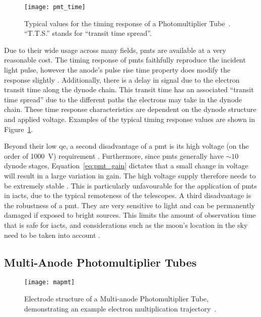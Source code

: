 \begin{figure}
	\centering
    \texttt{[image: pmt\_time]} 
	\caption[Photomultiplier Tube timing characteristics.]{Typical values for the timing response of a Photomultiplier Tube~\cite{Hamamatsu2016}. ``T.T.S.'' stands for ``transit time spread''.}
	\label{fig:pmt_time}
\end{figure}

Due to their wide usage across many fields, \glspl{pmt} are available at a very reasonable cost. The timing response of \glspl{pmt} faithfully reproduce the incident light pulse, however the anode's pulse rise time property does modify the response slightly \cite{Hamamatsu2016}. Additionally, there is a delay in signal due to the electron transit time along the dynode chain. This transit time has an associated ``transit time spread'' due to the different paths the electrons may take in the dynode chain. These time response characteristics are dependent on the dynode structure and applied voltage. Examples of the typical timing response values are shown in Figure~\ref{fig:pmt_time}.

Beyond their low \gls{qe}, a second disadvantage of a \gls{pmt} is its high voltage (on the order of \SI{1000}{V}) requirement \cite{Weekes2003}. Furthermore, since \glspl{pmt} generally have ${\sim} 10$ dynode stages, Equation~\ref{eq:pmt_gain} dictates that a small change in voltage will result in a large variation in gain. The high voltage supply therefore needs to be extremely stable \cite{Hamamatsu2016}. This is particularly unfavourable for the application of \glspl{pmt} in \glspl{iact}, due to the typical remoteness of the telescopes. A third disadvantage is the robustness of a \gls{pmt}. They are very sensitive to light and can be permanently damaged if exposed to bright sources. This limits the amount of observation time that is safe for \glspl{iact}, and considerations such as the moon's location in the sky need to be taken into account \cite{Knoetig2013}.

\subsection{Multi-Anode Photomultiplier Tubes}

\begin{figure}
	\centering
    \texttt{[image: mapmt]} 
	\caption[Internals of a Multi-anode Photomultiplier Tube.]{Electrode structure of a Multi-anode Photomultiplier Tube, demonstrating an example electron multiplication trajectory~\cite{HAMAMATSU2007}.}
	\label{fig:mapmt}
\end{figure}

